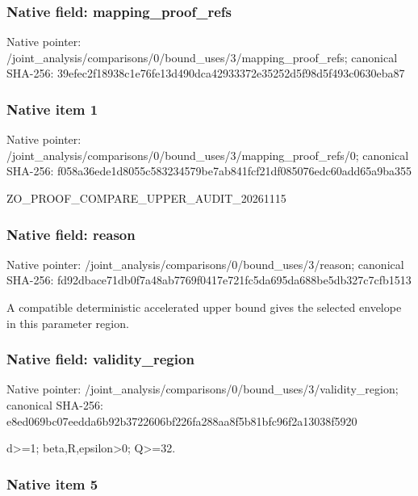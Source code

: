 \documentclass[10pt,a4paper]{article}
\begin{document}
\subsubsection{Native field: mapping\_proof\_refs}


Native pointer: /joint\_analysis/comparis\allowbreak{}ons/0/bound\_uses/3/mappi\allowbreak{}ng\_proof\_refs; canonical SHA-256: 39efec2f18938c1e76fe13d4\allowbreak{}90dca42933372e35252d5f98\allowbreak{}d5f493c0630eba87



\subsubsection{Native item 1}


Native pointer: /joint\_analysis/comparis\allowbreak{}ons/0/bound\_uses/3/mappi\allowbreak{}ng\_proof\_refs/0; canonical SHA-256: f058a36ede1d8055c5832345\allowbreak{}79be7ab841fcf21df085076e\allowbreak{}dc60add65a9ba355


ZO\_PROOF\_COMPARE\_UPPER\_AUDIT\_20261115


\subsubsection{Native field: reason}


Native pointer: /joint\_analysis/comparis\allowbreak{}ons/0/bound\_uses/3/reaso\allowbreak{}n; canonical SHA-256: fd92dbace71db0f7a48ab776\allowbreak{}9f0417e721fc5da695da688b\allowbreak{}e5db327c7cfb1513


A compatible deterministic accelerated upper bound gives the selected envelope in this parameter region.


\subsubsection{Native field: validity\_region}


Native pointer: /joint\_analysis/comparis\allowbreak{}ons/0/bound\_uses/3/valid\allowbreak{}ity\_region; canonical SHA-256: e8ed069bc07eedda6b92b372\allowbreak{}2606bf226fa288aa8f5b81bf\allowbreak{}c96f2a13038f5920


d>=1; beta,R,epsilon>0; Q>=32.


\subsubsection{Native item 5}
\end{document}
